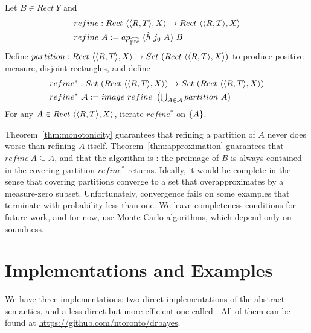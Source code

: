 \documentclass{llncs}
\newcommand{\prehat}{_\mathrm{\widehat{pre}}}
\begin{document}
\begin{definition}
\label{def:preimage-refinement}
Let $B \in Rect~Y$ and
\begin{equation}
\begin{aligned}
	&refine : Rect~\pair{\pair{R,T},X} \to Rect~\pair{\pair{R,T},X} \\
	&refine~A := ap\prehat~(\hat{h}~j_0~A)~B
\end{aligned}
\end{equation}
Define $partition : Rect~\langle{\langle{R,T}\rangle,X}\rangle \to Set~(Rect~\langle{\langle{R,T}\rangle,X}\rangle)$ to produce positive-measure, disjoint rectangles, and define
\begin{equation}
\begin{aligned}
	&refine^* : Set~(Rect~\langle{\langle{R,T}\rangle,X}\rangle) \to Set~(Rect~\langle{\langle{R,T}\rangle,X}\rangle) \\
	&refine^*~\mathcal{A} := image~refine~\left(\textstyle\bigcup_{A \in \mathcal{A}} partition~A \right)
\end{aligned}
\end{equation}
For any $A \in Rect~\langle{\langle{R,T}\rangle,X}\rangle$, iterate $refine^*$ on $\{{A}\}$.
\end{definition}

Theorem~\ref{thm:monotonicity} guarantees that refining a partition of $A$ never does worse than refining $A$ itself.
Theorem~\ref{thm:approximation} guarantees that $refine~A \subseteq A$, and that the algorithm is : the preimage of $B$ is always contained in the covering partition $refine^*$ returns.
Ideally, it would be complete in the sense that covering partitions converge to a set that overapproximates by a measure-zero subset.
Unfortunately, convergence fails on some examples that terminate with probability less than one.
We leave completeness conditions for future work, and for now, use Monte Carlo algorithms, which depend only on soundness.


\section{Implementations and Examples}
\label{sec:implementation}

We have three implementations: two direct implementations of the abstract semantics, and a less direct but more efficient one called .
All of them can be found at \url{https://github.com/ntoronto/drbayes}.
\end{document}

